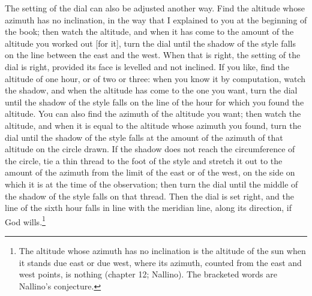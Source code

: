 \documentclass[11pt]{article}
\newcommand{\ArPage}[1]{\marginpar{\footnotesize\color{gray}Ar.\,p.\,#1}}
\begin{document}
\par \ArPage{206}The setting of the dial can also be adjusted another way. Find the altitude whose azimuth has no inclination, in the way that I explained to you at the beginning of the book; then watch the altitude, and when it has come to the amount of the altitude you worked out [for it], turn the dial until the shadow of the style falls on the line between the east and the west. When that is right, the setting of the dial is right, provided its face is levelled and not inclined. If you like, find the altitude of one hour, or of two or three: when you know it by computation, watch the shadow, and when the altitude has come to the one you want, turn the dial until the shadow of the style falls on the line of the hour for which you found the altitude. You can also find the azimuth of the altitude you want; then watch the altitude, and when it is equal to the altitude whose azimuth you found, turn the dial until the shadow of the style falls at the amount of the azimuth of that altitude on the circle drawn. If the shadow does not reach the circumference of the circle, tie a thin thread to the foot of the style and stretch it out to the amount of the azimuth from the limit of the east or of the west, on the side on which it is at the time of the observation; then turn the dial until the middle of the shadow of the style falls on that thread. Then the dial is set right, and the line of the sixth hour falls in line with the meridian line, along its direction, if God wills.\footnote{The altitude whose azimuth has no inclination is the altitude of the sun when it stands due east or due west, where its azimuth, counted from the east and west points, is nothing (chapter 12; Nallino). The bracketed words are Nallino's conjecture.}\par
\end{document}
